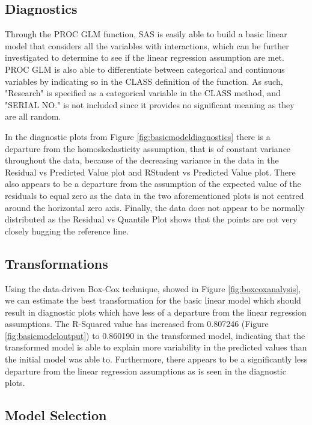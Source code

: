 \documentclass{article}
\begin{document}
\subsection*{Diagnostics}

Through the PROC GLM function, SAS is easily able to build a basic linear model that considers all the variables with interactions, which can be further investigated to determine to see if the linear regression assumption are met. PROC GLM is also able to differentiate between categorical and continuous variables by indicating so in the CLASS definition of the function. As such, "Research" is specified as a categorical variable in the CLASS method, and "SERIAL NO." is not included since it provides no significant meaning as they are all random.

In the diagnostic plots from Figure \ref{fig:basicmodeldiagnostics} there is a departure from the homoskedasticity assumption, that is of constant variance throughout the data, because of the decreasing variance in the data in the Residual vs Predicted Value plot and RStudent vs Predicted Value plot. There also appears to be a departure from the assumption of the expected value of the residuals to equal zero as the data in the two aforementioned plots is not centred around the horizontal zero axis. Finally, the data does not appear to be normally distributed as the Residual vs Quantile Plot shows that the points are not very closely hugging the reference line.

\subsection*{Transformations}
Using the data-driven Box-Cox technique, showed in Figure \ref{fig:boxcoxanalysis}, we can estimate the best transformation for the basic linear model which should result in diagnostic plots which have less of a departure from the linear regression assumptions. The R-Squared value has increased from 0.807246 (Figure \ref{fig:basicmodeloutput}) to 0.860190 in the transformed model, indicating that the transformed model is able to explain more variability in the predicted values than the initial model was able to. Furthermore, there appears to be a significantly less departure from the linear regression assumptions as is seen in the diagnostic plots.

\subsection*{Model Selection}
\end{document}
